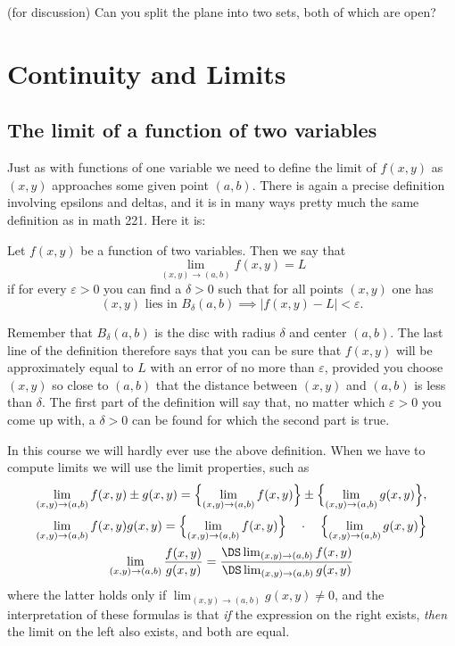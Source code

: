 \problem (for discussion) Can you split the plane into two sets, both
of which are open?

\rmfamily\normalsize

\section{Continuity and Limits}    %

\subsection{The limit of a function of two variables}    %
Just as with functions of one variable we need to define the limit of
$f(x, y)$ as $(x, y)$ approaches some given point $(a, b)$.  
There is again a precise definition involving epsilons and deltas, and
it is in many ways pretty much the same definition as in math 221.
Here it is:
\begin{definition}
  Let $f(x, y)$ be a function of two variables. Then we say that
  $$
  \lim_{(x, y) \to (a, b)} f(x, y) = L
  $$
  if for every $\varepsilon>0$ you can find a $\delta>0$ such that for
  all points $(x, y)$ one has
  \[
  \text{$(x, y)$ lies in $B_{\delta}(a, b)$} \implies
  |f(x, y) - L| <\varepsilon.
  \]
  \label{def:01limit}
\end{definition}

Remember that $B_\delta(a, b)$ is the disc with radius $\delta$ and
center $(a, b)$.  The last line of the definition therefore says that
you can be sure that $f(x, y)$ will be approximately equal to
$L$ with an error of no more than $\varepsilon$, provided you choose
$(x, y)$ so close to $(a,b)$ that the distance between $(x, y)$ and
$(a,b)$ is less than $\delta$.  The first part of the definition will
say that, no matter which $\varepsilon>0$ you come up with, a
$\delta>0$ can be found for which the second part is true.

In this course we will hardly ever use the above definition.  When we
have to compute limits we will use the limit properties, such as
\begin{gather}
  \lim_{(x, y) \to (a, b)} f(x, y) \pm g(x, y) =
  \Bigl\{\lim_{(x, y) \to (a, b)} f(x, y)\Bigr\}
  \pm
  \Bigl\{\lim_{(x, y) \to (a, b)} g(x, y)\Bigr\},
  \\
  \lim_{(x, y) \to (a, b)} f(x, y)g(x, y)
  =
  \Bigl\{\lim_{(x, y) \to (a, b)} f(x, y)\Bigr\}
  \quad\cdot\quad
  \Bigl\{\lim_{(x, y) \to (a, b)} g(x, y) \Bigr\}
  \\
  \lim_{(x, y) \to (a, b)} \frac{f(x, y)}{g(x, y)} =
  \frac{\DS
  \lim_{(x, y) \to (a, b)} f(x, y)}
  {\DS\lim_{(x,y)\to(a,b)} g(x, y)}
\end{gather}
where the latter holds only if $\lim_{(x, y) \to (a, b)} g(x, y) \neq
0$, and the interpretation of these formulas is that \emph{if} the
expression on the right exists, \emph{then} the limit on the left also
exists, and both are equal.

